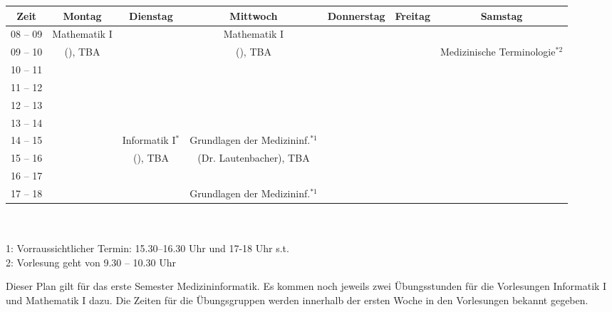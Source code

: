 \begin{minipage}{\textwidth}
    \footnotesize
\begin{center}
	\begin{table}[]
	\begin{tabular}{|c|c|c|c|c|c|c|}
	\hline
	 Zeit     &    Montag                    & Dienstag          & Mittwoch               	  	& Donnerstag & Freitag 	& Samstag\\ \hline\hline
	 08 -- 09 &    Mathematik I              &                   & Mathematik I      	  	&  &  			&\\ \cline{1-1} \cline{3-3} \cline{5-7} 
	 09 -- 10 &    (\Matheprof), TBA         &                   & (\Matheprof), TBA 	  	&  &  		       	& Medizinische Terminologie$^{*2}$\\ \hline
	 10 -- 11 &                              &                   &                   	  	&  &  			&\\ \cline{1-1} \cline{3-7} 
	 11 -- 12 &                              &                   &                   	  	&  &  			&\\ \hline
	 12 -- 13 &                              &                   &                   	  	&  &  			&\\ \hline
	 13 -- 14 &                              &                   &                   	  	&  &  			&\\ \hline
	 14 -- 15 &                              & Informatik I$^*$  & Grundlagen der Medizininf.$^{*1}$&  &  			&\\ \cline{1-2} \cline{4-7} 
	 15 -- 16 &                              & (\Infoprof), TBA  & (Dr. Lautenbacher), TBA    	&  &  			&\\ \cline{1-3} \cline{5-7}
	 16 -- 17 &                              &                   &                   	  	&  &  			&\\ \hline
	 17 -- 18 &                              &                   & Grundlagen der Medizininf.$^{*1}$&  &  			&\\ \hline
	\end{tabular}
	\end{table}
    ~\\
\scriptsize\\
1: Vorraussichtlicher Termin: 15.30--16.30 Uhr und 17-18 Uhr s.t.\\
2: Vorlesung geht von 9.30 -- 10.30 Uhr
\end{center}
\end{minipage}
Dieser Plan gilt für das erste Semester Medizininformatik. Es kommen noch jeweils zwei Übungsstunden für die Vorlesungen 
Informatik I und Mathematik I dazu. Die Zeiten für die Übungsgruppen werden innerhalb der ersten Woche in den Vorlesungen bekannt gegeben.
